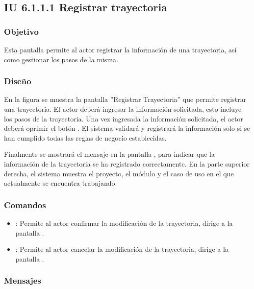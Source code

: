 \subsection{IU 6.1.1.1 Registrar trayectoria}

\subsubsection{Objetivo}
	Esta pantalla permite al actor registrar la información de una trayectoria, así como gestionar los pasos de la misma.
\subsubsection{Diseño}
	En la figura  se muestra la pantalla ''Registrar Trayectoria'' que permite registrar una trayectoria. El actor deberá ingresar la información solicitada, esto incluye los pasos de la trayectoria.
	Una vez ingresada la información solicitada, el actor deberá oprimir el botón  . El sistema validará y registrará la información solo si se han cumplido todas las reglas de negocio establecidas.
	
	Finalmente se mostrará el mensaje  en la pantalla , para indicar que la información de la trayectoria se ha registrado correctamente.
	En la parte superior derecha, el sistema muestra el proyecto, el módulo y el caso de uso en el que actualmente se encuentra trabajando.

\subsubsection{Comandos}
\begin{itemize}
	\item {}: Permite al actor confirmar la modificación de la trayectoria, dirige a la pantalla .
	\item {}: Permite al actor cancelar la modificación de la trayectoria, dirige a la pantalla .
\end{itemize}

\subsubsection{Mensajes}

